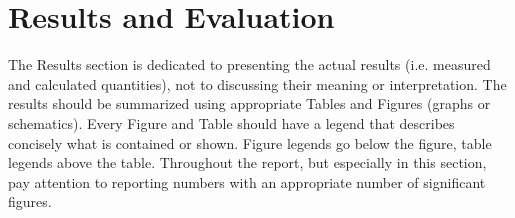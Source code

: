 \section{Results and Evaluation}
The Results section is dedicated to presenting the actual results (i.e. measured and calculated quantities), not to discussing their meaning or interpretation.
The results should be summarized using appropriate Tables and Figures (graphs or schematics).
Every Figure and Table should have a legend that describes concisely what is contained or shown.
Figure legends go below the figure, table legends above the table.
Throughout the report, but especially in this section, pay attention to reporting numbers with an appropriate number of significant figures.
